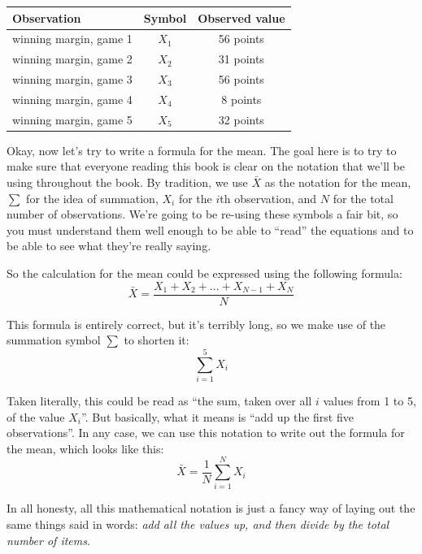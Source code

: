 \documentclass[
  11pt,
]{book}
\theoremstyle{definition}
\theoremstyle{definition}
\theoremstyle{definition}
\theoremstyle{definition}
\theoremstyle{remark}
\begin{document}
\begin{table}[H]
\centering
\begin{tabular}{lcc}
\toprule
Observation & Symbol & Observed value\\
\midrule
winning margin, game 1 & $X_1$ & 56 points\\
winning margin, game 2 & $X_2$ & 31 points\\
winning margin, game 3 & $X_3$ & 56 points\\
winning margin, game 4 & $X_4$ & 8 points\\
winning margin, game 5 & $X_5$ & 32 points\\
\bottomrule
\end{tabular}
\end{table}

Okay, now let's try to write a formula for the mean. The goal here is to try to make sure that everyone reading this book is clear on the notation that we'll be using throughout the book. By tradition, we use \(\bar{X}\) as the notation for the mean, \(\scriptstyle\sum\) for the idea of summation, \(X_i\) for the \(i\)th observation, and \(N\) for the total number of observations. We're going to be re-using these symbols a fair bit, so you must understand them well enough to be able to ``read'' the equations and to be able to see what they're really saying.

So the calculation for the mean could be expressed using the following formula:
\[
\bar{X} = \frac{X_1 + X_2 + ... + X_{N-1} + X_N}{N}
\]

This formula is entirely correct, but it's terribly long, so we make use of the summation symbol \(\scriptstyle\sum\) to shorten it:
\[
\sum_{i=1}^5 X_i
\]

Taken literally, this could be read as ``the sum, taken over all \(i\) values from 1 to 5, of the value \(X_i\)''. But basically, what it means is ``add up the first five observations''. In any case, we can use this notation to write out the formula for the mean, which looks like this:
\[
\bar{X} = \frac{1}{N} \sum_{i=1}^N X_i 
\]

In all honesty, all this mathematical notation is just a fancy way of laying out the same things said in words: \emph{add all the values up, and then divide by the total number of items}.
\end{document}
